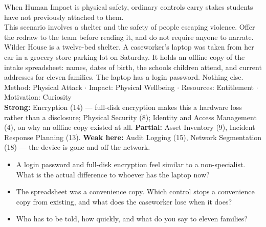  When Human Impact is physical safety, ordinary controls
carry stakes students have not previously attached to them.\\
 This scenario involves a shelter and the safety of people
escaping violence. Offer the redraw to the team before reading it, and do not
require anyone to narrate.\\
 Wilder House is a twelve-bed shelter. A caseworker's laptop was
taken from her car in a grocery store parking lot on Saturday. It holds an
offline copy of the intake spreadsheet: names, dates of birth, the schools
children attend, and current addresses for eleven families. The laptop has a
login password. Nothing else.\\
 Method: Physical Attack $\cdot$ Impact: Physical Wellbeing
$\cdot$ Resources: Entitlement $\cdot$ Motivation: Curiosity\\
 \textbf{Strong:} Encryption (14) --- full-disk encryption makes
this a hardware loss rather than a disclosure; Physical Security (8); Identity
and Access Management (4), on why an offline copy existed at all.
\textbf{Partial:} Asset Inventory (9), Incident Response Planning (13).
\textbf{Weak here:} Audit Logging (15), Network Segmentation (18) --- the device
is gone and off the network.\\
\begin{itemize}
\item A login password and full-disk encryption feel similar to a non-specialist.
What is the actual difference to whoever has the laptop now?
\item The spreadsheet was a convenience copy. Which control stops a convenience
copy from existing, and what does the caseworker lose when it does?
\item Who has to be told, how quickly, and what do you say to eleven families?
\end{itemize}

